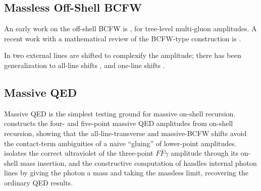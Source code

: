 \subsection{Massless Off-Shell BCFW}
\label{subsec:massless-off-shell-bcfw}

An early work on the off-shell BCFW is \autocite{vanHameren:2014iua}, for tree-level multi-gluon amplitudes. A recent work with a mathematical review of the BCFW-type construction is \autocite{Cohen:2024xuf}.

In \autocite{Britto:2005fq} two external lines are shifted to complexify the amplitude; there has been generalization to all-line shifts \autocite{Cohen:2010mi}, and one-line shifts \autocite {Cohen:2024xuf}.

\subsection{Massive QED}
\label{subsec:massive-qed}

Massive QED is the simplest testing ground for massive on-shell recursion. \autocite{Ema:2024vww} constructs the four- and five-point massive QED amplitudes from on-shell recursion, showing that the all-line-transverse and massive-BCFW shifts avoid the contact-term ambiguities of a naive ``gluing'' of lower-point amplitudes. \autocite{Ni:2025xkg} isolates the correct ultraviolet of the three-point $F\bar F\gamma$ amplitude through its on-shell mass insertion, and the constructive computation of \autocite{Christensen:2024bdt} handles internal photon lines by giving the photon a mass and taking the massless limit, recovering the ordinary QED results. 
